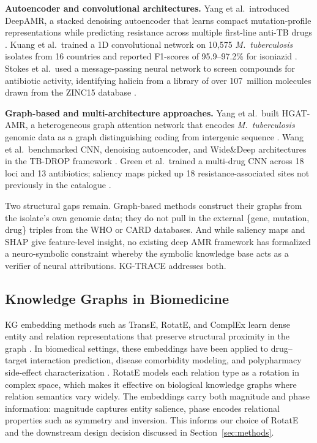 \documentclass[conference]{IEEEtran}
\begin{document}
\smallskip\noindent\textbf{Autoencoder and convolutional architectures.} Yang et al.\ introduced DeepAMR, a stacked denoising autoencoder that learns compact mutation-profile representations while predicting resistance across multiple first-line anti-TB drugs \cite{deepamr}. Kuang et al.\ trained a 1D convolutional network on 10,575 \textit{M.~tuberculosis} isolates from 16 countries and reported F1-scores of 95.9--97.2\% for isoniazid \cite{cnn_1d_mtb}. Stokes et al.\ used a message-passing neural network to screen compounds for antibiotic activity, identifying halicin from a library of over 107~million molecules drawn from the ZINC15 database \cite{stokes2020antibiotic}.

\smallskip\noindent\textbf{Graph-based and multi-architecture approaches.} Yang et al.\ built HGAT-AMR, a heterogeneous graph attention network that encodes \textit{M.~tuberculosis} genomic data as a graph distinguishing coding from intergenic sequence \cite{hgat_amr}. Wang et al.\ benchmarked CNN, denoising autoencoder, and Wide\&Deep architectures in the TB-DROP framework \cite{tbdrop}. Green et al.\ trained a multi-drug CNN across 18 loci and 13 antibiotics; saliency maps picked up 18 resistance-associated sites not previously in the catalogue \cite{cnn_amr}.

Two structural gaps remain. Graph-based methods construct their graphs from the isolate's own genomic data; they do not pull in the external \{gene, mutation, drug\} triples from the WHO or CARD databases. And while saliency maps and SHAP give feature-level insight, no existing deep AMR framework has formalized a neuro-symbolic constraint whereby the symbolic knowledge base acts as a verifier of neural attributions. KG-TRACE addresses both.

\subsection{Knowledge Graphs in Biomedicine}

KG embedding methods such as TransE, RotatE, and ComplEx learn dense entity and relation representations that preserve structural proximity in the graph \cite{rotate}. In biomedical settings, these embeddings have been applied to drug--target interaction prediction, disease comorbidity modeling, and polypharmacy side-effect characterization \cite{kg_drug_repurpose}. RotatE models each relation type as a rotation in complex space, which makes it effective on biological knowledge graphs where relation semantics vary widely. The embeddings carry both magnitude and phase information: magnitude captures entity salience, phase encodes relational properties such as symmetry and inversion. This informs our choice of RotatE and the downstream design decision discussed in Section~\ref{sec:methods}.
\end{document}
